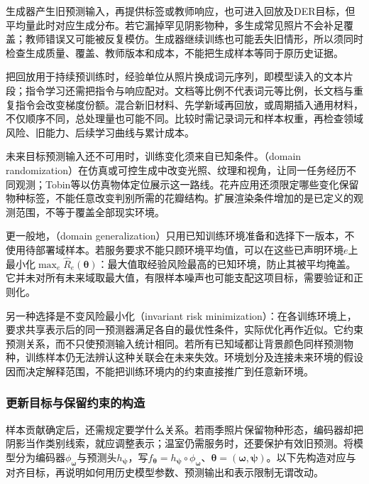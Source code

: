 生成器产生旧预测输入，再提供标签或教师响应，也可进入回放及DER目标，但平均量此时对应生成分布。若它漏掉罕见阴影物种，多生成常见照片不会补足覆盖；教师错误又可能被反复模仿。生成器继续训练也可能丢失旧情形，所以须同时检查生成质量、覆盖、教师版本和成本，不能把生成样本等同于原历史证据。

把回放用于持续预训练时，经验单位从照片换成词元序列，即模型读入的文本片段；指令学习还需把指令与响应配对。文档等比例不代表词元等比例，长文档与重复指令会改变梯度份额。混合新旧材料、先学新域再回放，或周期插入通用材料，不仅顺序不同，总处理量也可能不同。比较时需记录词元和样本权重，再检查领域风险、旧能力、后续学习曲线与累计成本。

未来目标预测输入还不可用时，训练变化须来自已知条件。（domain randomization）在仿真或可控生成中改变光照、纹理和视角，让同一任务经历不同观测；Tobin等以仿真物体定位展示这一路线。花卉应用还须限定哪些变化保留物种标签，不能任意改变判别所需的花瓣结构。扩展渲染条件增加的是已定义的观测范围，不等于覆盖全部现实环境。

更一般地，（domain generalization）只用已知训练环境准备和选择下一版本，不使用待部署域样本。若服务要求不能只顾环境平均值，可以在这些已声明环境$e$上最小化$\max_e\hat R_e(\bm{\theta})$：最大值取经验风险最高的已知环境，防止其被平均掩盖。它并未对所有未来域取最大值，有限样本噪声也可能支配这项目标，需要验证和正则化。

另一种选择是不变风险最小化（invariant risk minimization）：在各训练环境上，要求共享表示后的同一预测器满足各自的最优性条件，实际优化再作近似。它约束预测关系，而不只使预测输入统计相同。若所有已知域都让背景颜色同样预测物种，训练样本仍无法辨认这种关联会在未来失效。环境划分及连接未来环境的假设因而决定解释范围，不能把训练环境内的约束直接推广到任意新环境。

\subsubsection{更新目标与保留约束的构造}
\label{sec:ket-update-objective}

样本贡献确定后，还需规定要学什么关系。若雨季照片保留物种形态，编码器却把阴影当作类别线索，就应调整表示；温室仍需服务时，还要保护有效旧预测。将模型分为编码器$\phi_{\bm{\omega}}$与预测头$h_{\bm{\psi}}$，写$f_{\bm{\theta}}=h_{\bm{\psi}}\circ\phi_{\bm{\omega}}$、$\bm{\theta}=(\bm{\omega},\bm{\psi})$。以下先构造对应与对齐目标，再说明如何用历史模型参数、预测输出和表示限制无谓改动。

